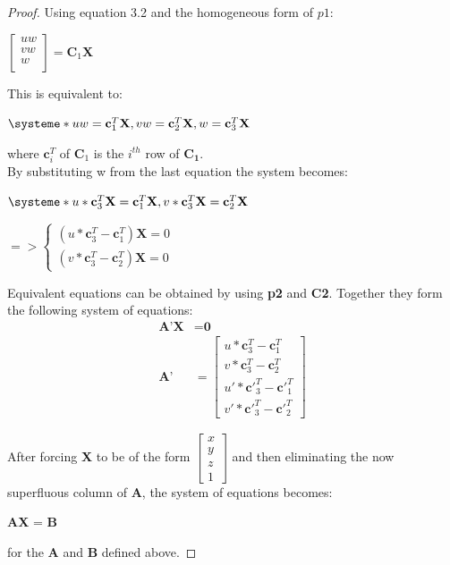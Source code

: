 \documentclass[12pt,a4paper,twoside,openright]{report}
\begin{document}
\begin{proof}
Using equation 3.2 and the homogeneous form of $p1$: \\
\begin{center}
$\begin{bmatrix}
	uw \\
	vw \\
	w \\
  \end{bmatrix} = \textbf{C}_{1}\textbf{X}$
\end{center}
This is equivalent to:
\begin{center}
$\systeme*{
uw = \textbf{c}_{1}^T \textbf{X},
vw = \textbf{c}_{2}^T \textbf{X},
w = \textbf{c}_{3}^T  \textbf{X}}$
\end{center}
where  $\mathbf{c}_{i}^T$ of $\mathbf{C}_{1}$ is the $i^{th}$ row of $\mathbf{C_{1}}$. \\

By substituting w from the last equation the system becomes:
\begin{center}
$\systeme*{
u * \textbf{c}_{3}^T \textbf{X} = \textbf{c}_{1}^T \textbf{X},
v * \textbf{c}_{3}^T \textbf{X} = \textbf{c}_{2}^T \textbf{X}}$ \\
\end{center}
\begin{center}
$ => \begin{cases}
(u * \mathbf{c}_{3}^T - \mathbf{c}_{1}^T) \mathbf{X} = 0  \\
(v * \textbf{c}_{3}^T - \mathbf{c}_{2}^T) \mathbf{X} = 0
\end{cases}$
\end{center}

Equivalent equations can be obtained by using \textbf{p2} and \textbf{C2}. Together they form the following system of equations:
\begin{align}
	\textbf{A'}\textbf{X} &= \textbf{0}\\ 
\textbf{A'} &= \begin{bmatrix}
u * \mathbf{c}_{3}^T - \mathbf{c}_{1}^T\\
v * \mathbf{c}_{3}^T - \mathbf{c}_{2}^T\\
u' * \mathbf{c'}_{3}^T - \mathbf{c'}_{1}^T\\
v' * \mathbf{c'}_{3}^T - \mathbf{c'}_{2}^T
\end{bmatrix}
\end{align}

After forcing \textbf{X} to be of the form 
$\begin{bmatrix}
x \\
y \\
z \\
1
\end{bmatrix}$ and then eliminating the now superfluous column of \textbf{A}, the system of equations becomes:
\begin{center}
	\textbf{A}\textbf{X} = \textbf{B}
\end{center} for the \textbf{A} and \textbf{B} defined above.
\end{proof}
\end{document}
